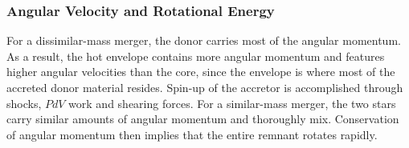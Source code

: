 

\subsubsection{Angular Velocity and Rotational Energy}
\label{sssec:c2_rottrends}

For a dissimilar-mass merger, the donor carries most of the angular momentum.  As a result, the hot envelope contains more angular momentum and features higher angular velocities than the core, since the envelope is where most of the accreted donor material resides.  Spin-up of the accretor is accomplished through shocks, $PdV$ work and shearing forces.  For a similar-mass merger, the two stars carry similar amounts of angular momentum and thoroughly mix.  Conservation of angular momentum then implies that the entire remnant rotates rapidly.

